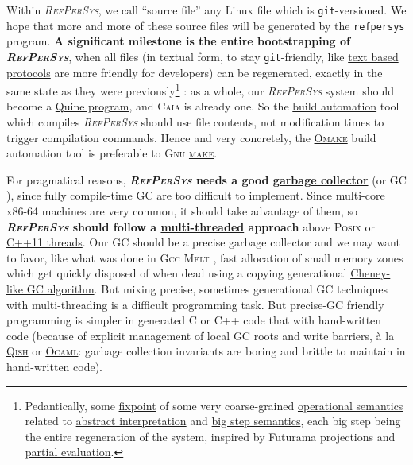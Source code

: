 \documentclass[11pt,a4paper,svgnames]{techreport}
\newcommand{\RefPerSys}{{\textit{\textsc{RefPerSys}}}}
\begin{document}
Within {\RefPerSys}, we call ``source file'' any Linux file which is
\texttt{git}-versioned. We hope that more and more of these source
files will be generated by the \texttt{refpersys} program. \textbf{A
  significant milestone is the entire bootstrapping of \RefPerSys},
when all files (in textual form, to stay \texttt{git}-friendly, like
\href{https://en.wikipedia.org/wiki/Text-based_protocol}{text based
  protocols} are more friendly for developers) can be regenerated,
exactly in the same state as they were
previously\footnote{Pedantically, some
\href{https://en.wikipedia.org/wiki/Fixed\_point\_(mathematics)}{fixpoint}
of some very coarse-grained
\href{https://en.wikipedia.org/wiki/Operational\_semantics}{operational
  semantics} related to
\href{https://en.wikipedia.org/wiki/Abstract\_interpretation}{abstract
  interpretation} and
\href{https://en.wikipedia.org/wiki/Operational\_semantics\#Structural\_operational\_semantics}{big
  step semantics}, each big step being the entire regeneration of the
system, inspired by Futurama projections and
\href{https://en.wikipedia.org/wiki/Partial\_evaluation}{partial
  evaluation}.} : as a whole, our {\RefPerSys} system should become a
\href{https://en.wikipedia.org/wiki/Quine\_(computing)}{Quine
  program}, and \textsc{Caia} is already one. So the
\href{https://en.wikipedia.org/wiki/Build\_automation}{build
  automation} tool which compiles {\RefPerSys} should use file
contents, not modification times to trigger compilation
commands. Hence and very concretely,
the \href{http://projects.camlcity.org/projects/omake.html}{\textsc{Omake}} build automation tool
is preferable to \textsc{Gnu}
\href{https://www.gnu.org/software/make/}{\textsc{make}}.

For pragmatical reasons, \textbf{{\RefPerSys} needs a good
  \href{https://en.wikipedia.org/wiki/Tracing\_garbage\_collection}{garbage
    collector}} (or GC \cite{jones:2016:gchandbook}), since fully
compile-time GC \cite{mazur:2004:compile} are too difficult to
implement. Since multi-core x86-64 machines are very common, it should
take advantage of them, so \textbf{{\RefPerSys} should follow a
  \href{https://en.wikipedia.org/wiki/Thread_(computing)}{multi-threaded}
  approach} above \textsc{Posix} \cite{barney:2010:pthreads} or
\href{https://en.cppreference.com/w/cpp/thread}{C++11 threads}. Our GC
should be a precise garbage collector \cite{Rafkind:2009:PreciseGC}
and we may want to favor, like what was done in \textsc{Gcc Melt}
\cite{Starynkevitch:2007:Multistage, Starynkevitch-DSL2011,
  Starynkevitch-GCCMELTweb}, fast allocation of small memory zones
which get quickly disposed of when dead using a copying generational
\href{https://en.wikipedia.org/wiki/Cheney's\_algorithm}{Cheney-like
  GC algorithm}.  But mixing precise, sometimes generational GC
techniques with multi-threading is a difficult programming task. But
precise-GC friendly programming is simpler in generated C or C++ code
that with hand-written code (because of explicit management of local
GC roots and write barriers, à la
\href{http://starynkevitch.net/Basile/qishintro.html}{\textsc{Qish}}
or
\href{https://caml.inria.fr/pub/docs/manual-ocaml/intfc.html}{\textsc{Ocaml}}:
garbage collection invariants are boring and brittle to maintain in
hand-written code).

\clearpage


\printbibliography
\end{document}
